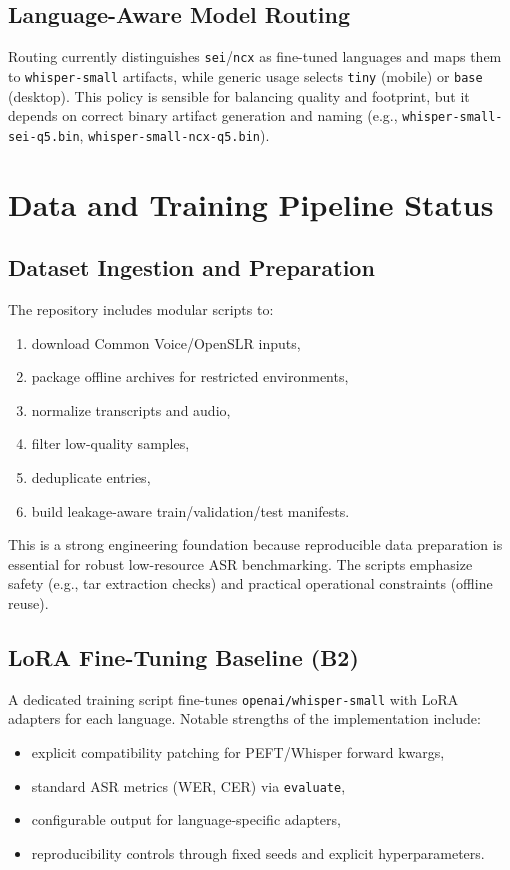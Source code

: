 \documentclass[11pt]{article}
\begin{document}
\subsection{Language-Aware Model Routing}
Routing currently distinguishes \texttt{sei}/\texttt{ncx} as fine-tuned languages and maps them to \texttt{whisper-small} artifacts, while generic usage selects \texttt{tiny} (mobile) or \texttt{base} (desktop). This policy is sensible for balancing quality and footprint, but it depends on correct binary artifact generation and naming (e.g., \texttt{whisper-small-sei-q5.bin}, \texttt{whisper-small-ncx-q5.bin}).

\section{Data and Training Pipeline Status}
\subsection{Dataset Ingestion and Preparation}
The repository includes modular scripts to:
\begin{enumerate}[leftmargin=1.3em]
    \item download Common Voice/OpenSLR inputs,
    \item package offline archives for restricted environments,
    \item normalize transcripts and audio,
    \item filter low-quality samples,
    \item deduplicate entries,
    \item build leakage-aware train/validation/test manifests.
\end{enumerate}

This is a strong engineering foundation because reproducible data preparation is essential for robust low-resource ASR benchmarking. The scripts emphasize safety (e.g., tar extraction checks) and practical operational constraints (offline reuse).

\subsection{LoRA Fine-Tuning Baseline (B2)}
A dedicated training script fine-tunes \texttt{openai/whisper-small} with LoRA adapters for each language. Notable strengths of the implementation include:
\begin{itemize}[leftmargin=1.3em]
    \item explicit compatibility patching for PEFT/Whisper forward kwargs,
    \item standard ASR metrics (WER, CER) via \texttt{evaluate},
    \item configurable output for language-specific adapters,
    \item reproducibility controls through fixed seeds and explicit hyperparameters.
\end{itemize}
\end{document}
